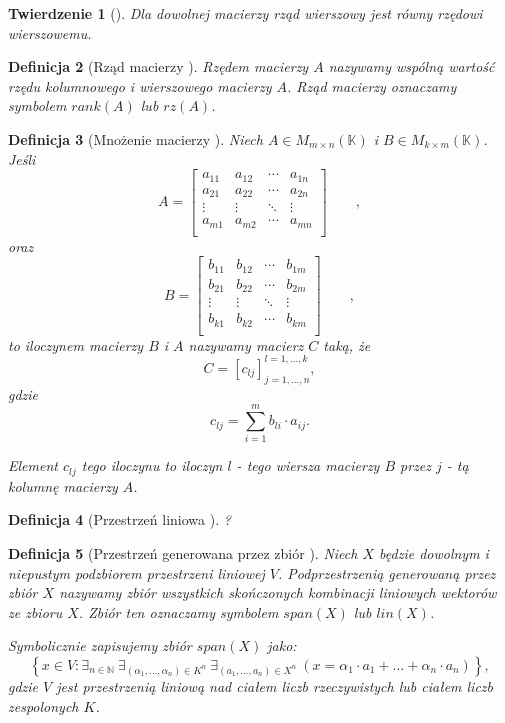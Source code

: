 \documentclass[12pt,a4paper]{report}
\newtheorem{df}{Definicja}[chapter]
\newtheorem{tw}[df]{Twierdzenie}
\newcommand{\set}[1]{\left\lbrace {#1} \right\rbrace}
\newcommand{\setK}{\mathbb{K}}
\newcommand{\setN}{\mathbb{N}}
\begin{document}
\begin{tw}[{\citep[Sec 8.1 Tw. 8.10]{alzega}}]
Dla dowolnej macierzy rząd wierszowy jest równy rzędowi wierszowemu.
\end{tw}

\begin{df}[Rząd macierzy {\citep[Sec 8.1]{alzega}}]
Rzędem macierzy $A$ nazywamy wspólną wartość rzędu kolumnowego i wierszowego macierzy $A$. Rząd macierzy oznaczamy symbolem $rank(A)$ lub $rz(A)$.
\end{df}

\begin{df}[Mnożenie macierzy {\citep[Sec 9.3 Def 9.13]{alzega}}]
Niech $A \in M_{m \times n} (\setK)$ i $B \in M_{k \times m} (\setK)$.
Jeśli
$$
A = \left[
        \begin{array}{cccc}
         a_{11} & a_{12} & \cdots & a_{1n} \\
         a_{21} & a_{22} & \cdots & a_{2n} \\
         \vdots & \vdots & \ddots & \vdots \\
         a_{m1} & a_{m2} & \cdots & a_{mn} \\
         \end{array}
      \right]
      \qquad, 
$$
oraz
$$
B = \left[
        \begin{array}{cccc}
         b_{11} & b_{12} & \cdots & b_{1m} \\
         b_{21} & b_{22} & \cdots & b_{2m} \\
         \vdots & \vdots & \ddots & \vdots \\
         b_{k1} & b_{k2} & \cdots & b_{km} \\
         \end{array}
      \right]
      \qquad, 
$$
to iloczynem macierzy $B$ i $A$ nazywamy macierz $C$ taką, że 
$$
C = [c_{lj}]_{j = 1, \ldots, n}^{l = 1, \ldots , k},
$$
gdzie
$$
c_{lj} = \sum_{i=1}^m b_{li} \cdot a_{ij}.
$$

Element $c_{lj}$ tego iloczynu to iloczyn $l$ - tego wiersza macierzy $B$ przez $j$ - tą kolumnę macierzy $A$.
\end{df}

\begin{df}[Przestrzeń liniowa {\citep[Sec 7.1]{alzega}}]
?
\end{df}

\begin{df}[Przestrzeń generowana przez zbiór {\citep[Sec 7.1 Def 7.13]{alzega}}]
Niech $X$ będzie dowolnym i niepustym podzbiorem przestrzeni liniowej $V$. Podprzestrzenią generowaną przez zbiór $X$ nazywamy zbiór wszystkich  skończonych kombinacji liniowych wektorów ze zbioru $X$. Zbiór ten oznaczamy symbolem $span(X)$ lub $lin(X)$.

Symbolicznie zapisujemy zbiór $span(X)$ jako:
$$
\set{x \in V : \exists_{n \in \setN} \: \exists_{(\alpha_1, \ldots, \alpha_n) \in K^n } \: \exists_{(a_1, \ldots, a_n) \in X^n} \: (x = \alpha_1 \cdot a_1 + \ldots + \alpha_n \cdot a_n)},
$$
gdzie $V$ jest przestrzenią liniową nad ciałem liczb rzeczywistych lub ciałem liczb zespolonych $K$.
\end{df}
\end{document}
